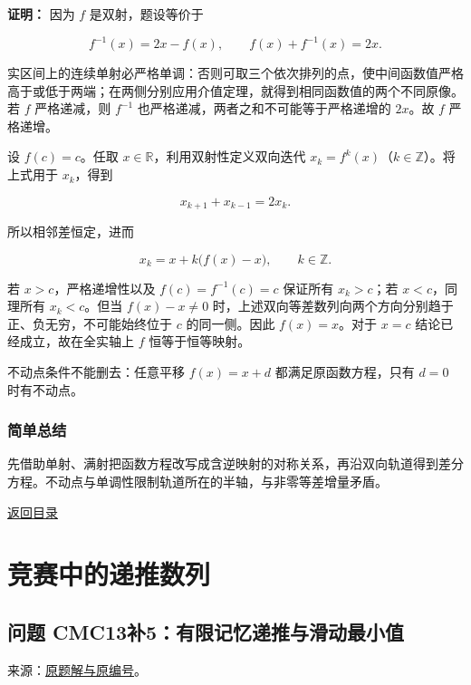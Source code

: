 \documentclass[11pt,a4paper]{article}
\begin{document}
\textbf{证明：} 因为 \(f\) 是双射，题设等价于

\[
f^{-1}(x)=2x-f(x),\qquad f(x)+f^{-1}(x)=2x.
\]

实区间上的连续单射必严格单调：否则可取三个依次排列的点，使中间函数值严格高于或低于两端；在两侧分别应用介值定理，就得到相同函数值的两个不同原像。若
\(f\) 严格递减，则 \(f^{-1}\) 也严格递减，两者之和不可能等于严格递增的
\(2x\)。故 \(f\) 严格递增。

设 \(f(c)=c\)。任取 \(x\in\mathbb R\)，利用双射性定义双向迭代
\(x_k=f^k(x)\)（\(k\in\mathbb Z\)）。将上式用于 \(x_k\)，得到

\[
x_{k+1}+x_{k-1}=2x_k.
\]

所以相邻差恒定，进而

\[
x_k=x+k\bigl(f(x)-x\bigr),\qquad k\in\mathbb Z.
\]

若 \(x>c\)，严格递增性以及 \(f(c)=f^{-1}(c)=c\) 保证所有 \(x_k>c\)；若
\(x<c\)，同理所有 \(x_k<c\)。但当 \(f(x)-x\ne0\)
时，上述双向等差数列向两个方向分别趋于正、负无穷，不可能始终位于 \(c\)
的同一侧。因此 \(f(x)=x\)。对于 \(x=c\) 结论已经成立，故在全实轴上 \(f\)
恒等于恒等映射。

不动点条件不能删去：任意平移 \(f(x)=x+d\) 都满足原函数方程，只有 \(d=0\)
时有不动点。

\subsubsection{简单总结}\label{ux7b80ux5355ux603bux7ed3-17}

先借助单射、满射把函数方程改写成含逆映射的对称关系，再沿双向轨道得到差分方程。不动点与单调性限制轨道所在的半轴，与非零等差增量矛盾。

\noindent\hyperref[contents]{返回目录}

\clearpage

\section{竞赛中的递推数列}\label{ux7adeux8d5bux4e2dux7684ux9012ux63a8ux6570ux5217}

\subsection{问题
CMC13补5：有限记忆递推与滑动最小值}\label{ux95eeux9898-cmc13ux88655ux6709ux9650ux8bb0ux5fc6ux9012ux63a8ux4e0eux6ed1ux52a8ux6700ux5c0fux503c}

来源：\href{https://zj139.github.io/math-notes/essays/d27224ee77886a8a75ca7b76/\#问题-5}{原题解与原编号}。
\end{document}
